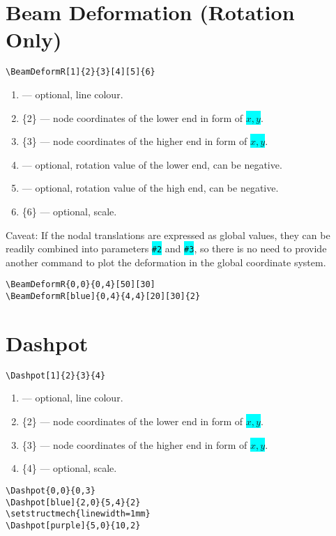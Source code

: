 \documentclass[10pt,a4paper]{article}
\newcommand*{\Highlight}[1]{\colorbox{cyan}{\color{red}\texttt{#1}}}
\begin{document}
\section{Beam Deformation (Rotation Only)}
\begin{Verbatim}[frame=single,label=Syntax]
\BeamDeformR[1]{2}{3}[4][5]{6}
\end{Verbatim}
\begin{enumerate}
\item[][1] --- optional, line colour.
\item[]\{2\} --- node coordinates of the lower end in form of \Highlight{$x,y$}.
\item[]\{3\} --- node coordinates of the higher end in form of \Highlight{$x,y$}.
\item[][4] --- optional, rotation value of the lower end, can be negative.
\item[][5] --- optional, rotation value of the high end, can be negative.
\item[]\{6\} --- optional, scale.
\end{enumerate}
Caveat: If the nodal translations are expressed as global values, they can be readily combined into parameters \Highlight{\#2} and \Highlight{\#3}, so there is no need to provide another command to plot the deformation in the global coordinate system.
\begin{Verbatim}[frame=single,label=Example]
\BeamDeformR{0,0}{0,4}[50][30]
\BeamDeformR[blue]{0,4}{4,4}[20][30]{2}
\end{Verbatim}
\begin{figure}[H]
\centering
{}
\end{figure}
\section{Dashpot}
\begin{Verbatim}[frame=single,label=Syntax]
\Dashpot[1]{2}{3}{4}
\end{Verbatim}
\begin{enumerate}
\item[][1] --- optional, line colour.
\item[]\{2\} --- node coordinates of the lower end in form of \Highlight{$x,y$}.
\item[]\{3\} --- node coordinates of the higher end in form of \Highlight{$x,y$}.
\item[]\{4\} --- optional, scale.
\end{enumerate}
\begin{Verbatim}[frame=single,label=Example]
\Dashpot{0,0}{0,3}
\Dashpot[blue]{2,0}{5,4}{2}
\setstructmech{linewidth=1mm}
\Dashpot[purple]{5,0}{10,2}
\end{Verbatim}
\begin{figure}[H]
\centering
{}
\end{figure}
\end{document}
